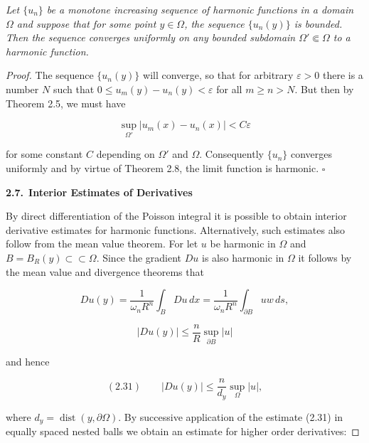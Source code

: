 \medskip

\begin{theorem}\label{gt.thm2.9}
\textit{Let $\{u_n\}$ be a monotone increasing sequence of harmonic functions in a domain $\Omega$ and suppose that for some point $y \in \Omega$, the sequence $\{u_n(y)\}$ is bounded. Then the sequence converges uniformly on any bounded subdomain $\Omega' \Subset \Omega$ to a harmonic function.}

\medskip

\begin{proof}
The sequence $\{u_n(y)\}$ will converge, so that for arbitrary $\varepsilon>0$ there is a number $N$ such that $0 \leq u_m(y)-u_n(y)<\varepsilon$ for all $m \geq n > N$. But then by Theorem 2.5, we must have

\[
\sup_{\Omega'} |u_m(x)-u_n(x)| < C\varepsilon
\]

for some constant $C$ depending on $\Omega'$ and $\Omega$. Consequently $\{u_n\}$ converges uniformly and by virtue of Theorem 2.8, the limit function is harmonic. \quad $\square$

\bigskip

\noindent\textbf{2.7.}\ \textbf{Interior Estimates of Derivatives}

\medskip

By direct differentiation of the Poisson integral it is possible to obtain interior derivative estimates for harmonic functions. Alternatively, such estimates also follow from the mean value theorem. For let $u$ be harmonic in $\Omega$ and $B=B_R(y)\subset\subset \Omega$. Since the gradient $Du$ is also harmonic in $\Omega$ it follows by the mean value and divergence theorems that

\[
Du(y)=\frac{1}{\omega_n R^n}\int_B Du\,dx=\frac{1}{\omega_n R^n}\int_{\partial B} uw\,ds,
\]

\[
|Du(y)|\leq \frac{n}{R}\sup_{\partial B}|u|
\]

and hence

\[
(2.31)\qquad |Du(y)|\leq \frac{n}{d_y}\sup_{\Omega}|u|,
\]

where $d_y=\operatorname{dist}(y,\partial\Omega)$. By successive application of the estimate (2.31) in equally spaced nested balls we obtain an estimate for higher order derivatives:
\end{proof}
\end{theorem}



